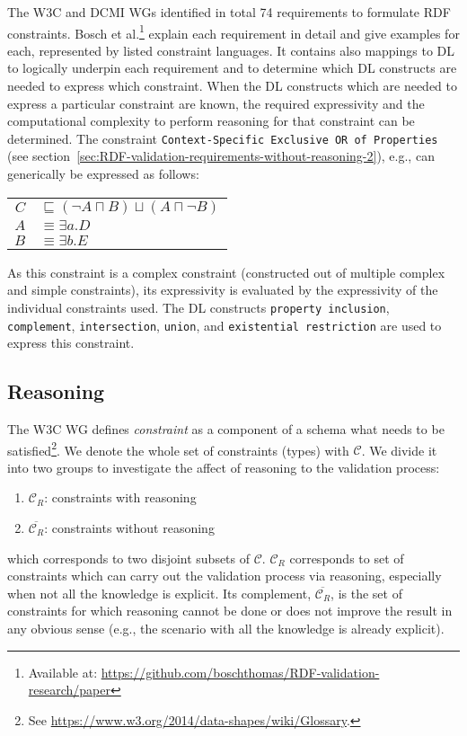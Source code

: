 \documentclass{llncs}
\newcommand{\ms}[1]{\texttt{#1}}
\newcommand{\tb}[1]{\todo[size=\small, color=green!40]{\textbf{Thomas:} #1}}
\newcommand{\er}[1]{\todo[size=\small, color=red!40]{\textbf{Erman:} #1}}
\newenvironment{DL}{
  \vspace{0cm}
  \begin{tabular}{r l}

}{
  \end{tabular}
}
\begin{document}
The W3C and DCMI WGs identified in total 74 requirements to formulate RDF constraints.  
Bosch et al.\footnote{Available at: \url{https://github.com/boschthomas/RDF-validation-research/paper}} explain each requirement in detail and give examples for each, represented by listed constraint languages.
It contains also mappings to DL to logically underpin each requirement and to determine which DL constructs are needed to express which constraint.
When the DL constructs  which are needed to express a particular constraint are known, the required expressivity and the computational complexity to perform reasoning for that constraint can be determined. 
The constraint \ms{Context-Specific Exclusive OR of Properties} (see section~\ref{sec:RDF-validation-requirements-without-reasoning-2}), e.g., can generically be expressed as follows:
\begin{center}
\begin{DL}
$C$ &$\sqsubseteq (\neg A \sqcap B) \sqcup (A \sqcap \neg B)$ \\
$A$ &$\equiv \exists a.D$ \\
$B$ &$\equiv \exists b.E$  
\end{DL}
\end{center}
As this constraint is a complex constraint (constructed out of multiple complex and simple constraints), its expressivity is evaluated by the expressivity of the individual constraints used.
The DL constructs \ms{property inclusion}, \ms{complement}, \ms{intersection}, \ms{union}, and \ms{existential restriction} are used to express this constraint.  


\subsection{Reasoning}

The W3C WG defines \emph{constraint} as a component of a schema what needs to be satisfied\footnote{See \url{https://www.w3.org/2014/data-shapes/wiki/Glossary}.}. 
We denote the whole set of constraints (types) with $\mathcal{C}$. We divide it into two groups   to investigate the affect of reasoning to the validation process:
\begin{enumerate}
	\item $\mathcal{C}_R$: constraints with reasoning
	\item $\overline{\mathcal{C}_{R}}$: constraints without reasoning %
\end{enumerate}
 which corresponds to two disjoint subsets of $\mathcal{C}$. $\mathcal{C}_R$ corresponds to set of constraints which can carry out the validation process via reasoning, especially when not all the knowledge is explicit.  
Its complement, $\overline{\mathcal{C}_R}$, is the set of constraints for which reasoning cannot be done or does not improve the result in any obvious sense (e.g., the scenario with all the knowledge is already explicit).
\end{document}
